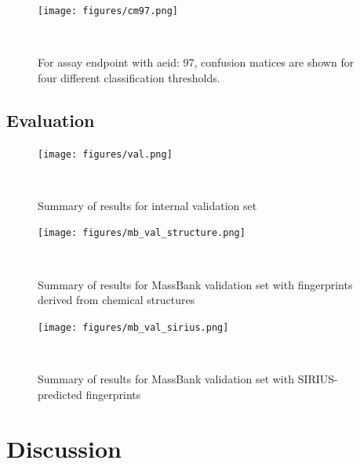 \begin{figure} 
  \centering
  \texttt{[image: figures/cm97.png]}
  \caption{For assay endpoint with aeid: 97, confusion matices are shown for four different classification thresholds.}
~\label{fig:confusion_matrix}
\end{figure}



\subsection{Evaluation}\label{sec:evaluation}
\begin{figure} 
  \centering
  \texttt{[image: figures/val.png]}
  \caption{Summary of results for internal validation set}
~\label{fig:confusion_matrix}
\end{figure}

\begin{figure} 
  \centering
  \texttt{[image: figures/mb\_val\_structure.png]}
  \caption{Summary of results for MassBank validation set with fingerprints derived from chemical structures}
~\label{fig:confusion_matrix}
\end{figure}

\begin{figure} 
  \centering
  \texttt{[image: figures/mb\_val\_sirius.png]}
  \caption{Summary of results for MassBank validation set with SIRIUS-predicted fingerprints}
~\label{fig:confusion_matrix}
\end{figure}

\section{Discussion}\label{sec:discussion}


